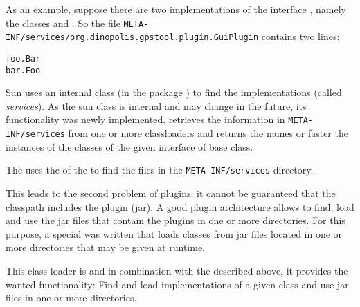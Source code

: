 \documentclass[a4paper]{article} %
\begin{document}
As an example, suppose there are two implementations of the interface
, namely the
classes  and . So the file
\texttt{META-INF/services/org.dinopolis.gpstool.plugin.GuiPlugin}
contains two lines:
\begin{verbatim}
foo.Bar
bar.Foo
\end{verbatim}

Sun uses an internal class (in the package ) to
find the implementations (called \textit{services}). As the sun class
is internal and may change in the future, its functionality was newly
implemented. 
retrieves the information in \texttt{META-INF/services} from one or
more classloaders and returns the names or faster the instances of the
classes of the given interface of base class.

The  uses the
 of the  to
find the files in the \texttt{META-INF/services} directory. 

This leads to the second problem of plugins: it cannot be guaranteed
that the classpath includes the plugin (jar). A good plugin
architecture allows to find, load and use the jar files that contain
the plugins in one or more directories. For this purpose, a special
 was written that loads classes from jar files
located in one or more directories that may be given at runtime.

This class loader is
and in combination with the  described
above, it provides the wanted functionality: Find and load
implementations of a given class and use jar files in one or more
directories.










%
% 



\documentend
\end{document}
